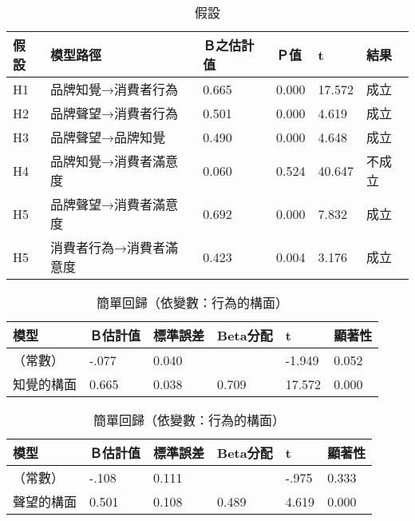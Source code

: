 \begin{table}[htb]
\caption{假設}
\label{tab:p7}
\renewcommand{\arraystretch}{1.2} %
\arrayrulewidth=1pt               %
\tabcolsep=10pt                   %
\begin{tabular}[t]{llllll}  %
\hline
 假設&模型路徑&Ｂ之估計值& Ｐ值& t& 結果 \\
\hline
H1&品牌知覺→消費者行為&0.665&0.000&17.572&成立\\
H2&品牌聲望→消費者行為&0.501&0.000&4.619&成立\\
H3&品牌聲望→品牌知覺&0.490&0.000&4.648&成立\\
H4&品牌知覺→消費者滿意度&0.060&0.524&40.647&不成立\\
H5&品牌聲望→消費者滿意度&0.692&0.000&7.832&成立\\
H5&消費者行為→消費者滿意度&0.423&0.004&3.176&成立\\
\hline
\end{tabular}
\end{table}

\begin{table}[htb]
\caption{簡單回歸（依變數：行為的構面）}
\label{tab:r01}
\renewcommand{\arraystretch}{1.2} %
\arrayrulewidth=1pt               %
\tabcolsep=10pt                   %
\begin{tabular}[t]{llllll}  %
\hline
 模型&Ｂ估計值&標準誤差&Beta分配&t&顯著性\\
\hline
（常數）&-.077&0.040& &-1.949&0.052\\
知覺的構面&0.665&0.038&0.709&17.572&0.000\\
\hline
\end{tabular}
\end{table}

\begin{table}[htb]
\caption{簡單回歸（依變數：行為的構面）}
\label{tab:r02}
\renewcommand{\arraystretch}{1.2} %
\arrayrulewidth=1pt               %
\tabcolsep=10pt                   %
\begin{tabular}[t]{llllll}  %
\hline
 模型&Ｂ估計值&標準誤差&Beta分配&t&顯著性\\
\hline
（常數）&-.108&0.111& &-.975&0.333\\
聲望的構面&0.501&0.108&0.489&4.619&0.000\\
\hline
\end{tabular}
\end{table}


